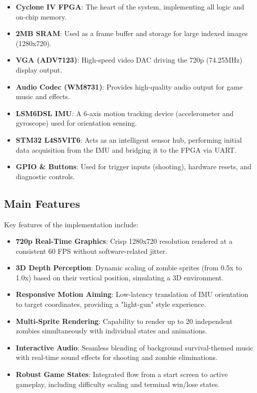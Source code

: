 \documentclass[12pt,a4paper]{article}
\begin{document}
\begin{itemize}
    \item \textbf{Cyclone IV FPGA}: The heart of the system, implementing all logic and on-chip memory.
    \item \textbf{2MB SRAM}: Used as a frame buffer and storage for large indexed images (1280x720).
    \item \textbf{VGA (ADV7123)}: High-speed video DAC driving the 720p (74.25MHz) display output.
    \item \textbf{Audio Codec (WM8731)}: Provides high-quality audio output for game music and effects.
    \item \textbf{LSM6DSL IMU}: A 6-axis motion tracking device (accelerometer and gyroscope) used for orientation sensing.
    \item \textbf{STM32 L4S5VIT6}: Acts as an intelligent sensor hub, performing initial data acquisition from the IMU and bridging it to the FPGA via UART.
    \item \textbf{GPIO \& Buttons}: Used for trigger inputs (shooting), hardware resets, and diagnostic controls.
\end{itemize}

\subsection{Main Features}

Key features of the implementation include:

\begin{itemize}
    \item \textbf{720p Real-Time Graphics}: Crisp 1280x720 resolution rendered at a consistent 60 FPS without software-related jitter.
    \item \textbf{3D Depth Perception}: Dynamic scaling of zombie sprites (from 0.5x to 1.0x) based on their vertical position, simulating a 3D environment.
    \item \textbf{Responsive Motion Aiming}: Low-latency translation of IMU orientation to target coordinates, providing a "light-gun" style experience.
    \item \textbf{Multi-Sprite Rendering}: Capability to render up to 20 independent zombies simultaneously with individual states and animations.
    \item \textbf{Interactive Audio}: Seamless blending of background survival-themed music with real-time sound effects for shooting and zombie eliminations.
    \item \textbf{Robust Game States}: Integrated flow from a start screen to active gameplay, including difficulty scaling and terminal win/lose states.
\end{itemize}
\end{document}
